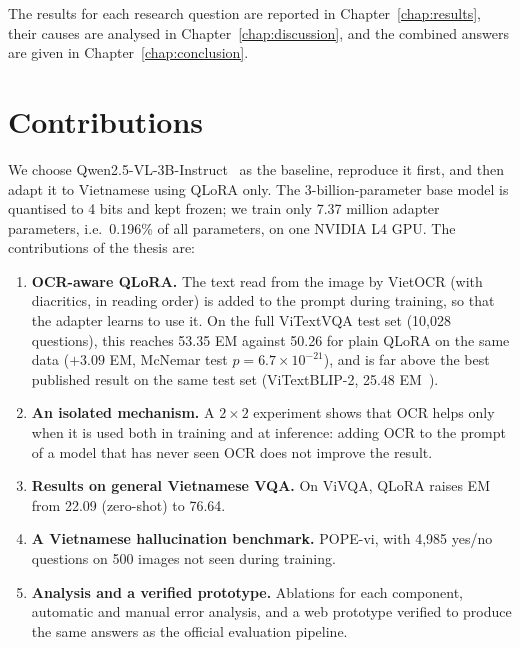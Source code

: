 The results for each research question are reported in Chapter~\ref{chap:results},
their causes are analysed in Chapter~\ref{chap:discussion}, and the combined answers
are given in Chapter~\ref{chap:conclusion}.

\section{Contributions}
\label{sec:intro-contrib}

We choose Qwen2.5-VL-3B-Instruct~\cite{bai2025qwen25vl} as the baseline,
reproduce it first, and then adapt it to Vietnamese using QLoRA only. The
3-billion-parameter base model is quantised to 4 bits and kept frozen; we
train only 7.37 million adapter parameters, i.e.\ 0.196\% of all parameters, on one
NVIDIA L4 GPU. The contributions of the thesis are:

\begin{enumerate}
  \item \textbf{OCR-aware QLoRA.} The text read from the image by VietOCR (with
  diacritics, in reading order) is added to the prompt during training, so
  that the adapter learns to use it. On the full ViTextVQA test set (10,028
  questions), this reaches 53.35 EM against 50.26 for plain QLoRA on the same data
  ($+3.09$ EM, McNemar test $p = 6.7\times10^{-21}$), and is far above the best published
  result on the same test set (ViTextBLIP-2, 25.48
  EM~\cite{nguyen2024vitextvqa}).
  \item \textbf{An isolated mechanism.} A $2\times2$ experiment shows that OCR helps
  only when it is used both in training and at inference: adding OCR to the prompt of
  a model that has never seen OCR does not improve the result.
  \item \textbf{Results on general Vietnamese VQA.} On ViVQA, QLoRA raises EM from
  22.09 (zero-shot) to 76.64.
  \item \textbf{A Vietnamese hallucination benchmark.} POPE-vi, with 4,985 yes/no
  questions on 500 images not seen during training.
  \item \textbf{Analysis and a verified prototype.} Ablations for each component,
  automatic and manual error analysis, and a web prototype verified to produce the
  same answers as the official evaluation pipeline.
\end{enumerate}

